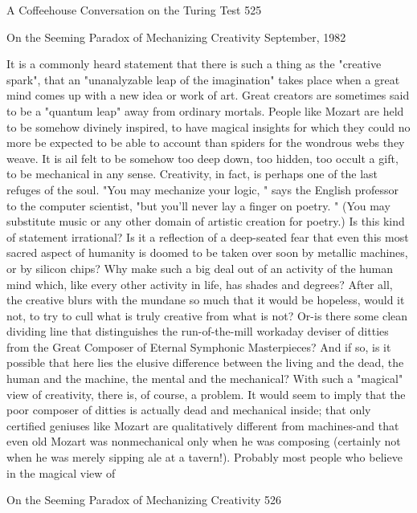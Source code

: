 A Coffeehouse Conversation on the Turing Test                                      525

                      On the Seeming Paradox of
                       Mechanizing Creativity
                                    September, 1982


It is a commonly heard statement that there is such a thing as the "creative spark",
that an "unanalyzable leap of the imagination" takes place when a great mind comes
up with a new idea or work of art. Great creators are sometimes said to be a "quantum
leap" away from ordinary mortals. People like Mozart are held to be somehow
divinely inspired, to have magical insights for which they could no more be expected
to be able to account than spiders for the wondrous webs they weave. It is ail felt to be
somehow too deep down, too hidden, too occult a gift, to be mechanical in any sense.
Creativity, in fact, is perhaps one of the last refuges of the soul. "You may mechanize
your logic, " says the English professor to the computer scientist, "but you'll never lay
a finger on poetry. " (You may substitute music or any other domain of artistic
creation for poetry.)
        Is this kind of statement irrational? Is it a reflection of a deep-seated fear that
even this most sacred aspect of humanity is doomed to be taken over soon by metallic
machines, or by silicon chips? Why make such a big deal out of an activity of the
human mind which, like every other activity in life, has shades and degrees? After all,
the creative blurs with the mundane so much that it would be hopeless, would it not,
to try to cull what is truly creative from what is not? Or-is there some clean dividing
line that distinguishes the run-of-the-mill workaday deviser of ditties from the Great
Composer of Eternal Symphonic Masterpieces? And if so, is it possible that here lies
the elusive difference between the living and the dead, the human and the machine,
the mental and the mechanical?
        With such a "magical" view of creativity, there is, of course, a problem. It
would seem to imply that the poor composer of ditties is actually dead and mechanical
inside; that only certified geniuses like Mozart are qualitatively different from
machines-and that even old Mozart was nonmechanical only when he was composing
(certainly not when he was merely sipping ale at a tavern!). Probably most people
who believe in the magical view of




On the Seeming Paradox of Mechanizing Creativity                                       526


